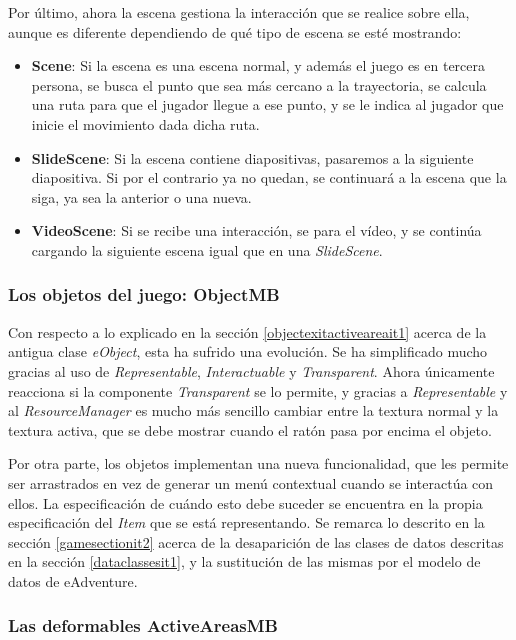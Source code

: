 Por último, ahora la escena gestiona la interacción que se realice sobre ella, aunque es diferente dependiendo de qué tipo de escena se esté mostrando:
\begin{itemize}
	\item \textbf{Scene}: Si la escena es una escena normal, y además el juego es en tercera persona, se busca el punto que sea más cercano a la trayectoria, se calcula una ruta para que el jugador llegue a ese punto, y se le indica al jugador que inicie el movimiento dada dicha ruta.
	
	\item \textbf{SlideScene}: Si la escena contiene diapositivas, pasaremos a la siguiente diapositiva. Si por el contrario ya no quedan, se continuará a la escena que la siga, ya sea la anterior o una nueva.
	
	\item \textbf{VideoScene}: Si se recibe una interacción, se para el vídeo, y se continúa cargando la siguiente escena igual que en una \textit{SlideScene}.
\end{itemize}

\subsubsection{Los objetos del juego: ObjectMB}
\label{itemsit2}

Con respecto a lo explicado en la sección \ref{objectexitactiveareait1} acerca de la antigua clase \textit{eObject}, esta ha sufrido una evolución. Se ha simplificado mucho gracias al uso de \textit{Representable}, \textit{Interactuable} y \textit{Transparent}. Ahora únicamente reacciona si la componente \textit{Transparent} se lo permite, y gracias a \textit{Representable} y al \textit{ResourceManager} es mucho más sencillo cambiar entre la textura normal y la textura activa, que se debe mostrar cuando el ratón pasa por encima el objeto.

Por otra parte, los objetos implementan una nueva funcionalidad, que les permite ser arrastrados en vez de generar un menú contextual cuando se interactúa con ellos. La especificación de cuándo esto debe suceder se encuentra en la propia especificación del \textit{Item} que se está representando. Se remarca lo descrito en la sección \ref{gamesectionit2} acerca de la desaparición de las clases de datos descritas en la sección \ref{dataclassesit1}, y la sustitución de las mismas por el modelo de datos de eAdventure.

\subsubsection{Las deformables ActiveAreasMB}
\label{activeareasectionit2}

